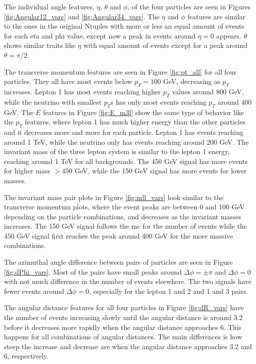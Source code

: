 \documentclass[a4paper, american, 12pt]{report}
\begin{document}
	The individual angle features, $\eta$, $\theta$ and $\phi$, of the four particles are seen in Figures \ref{fig:Angular12_vars} and \ref{fig:Angular34_vars}. The $\eta$ and $\phi$ features are similar to the ones in the original Ntuples with more or less an equal amount of events for each eta and phi value, except now a peak in events around $\eta=0$ appears. $\theta$ shows similar traits like $\eta$ with equal amount of events except for a peak around $\theta=\pi/2$.

	The transverse momentum features are seen in Figure \ref{fig:pt_all} for all four particles. They all have most events below $p_T=100$ GeV, decreasing as $p_T$ increases. Lepton 1 has most events reaching higher $p_T$ values around 800 GeV, while the neutrino with smallest $p_T$s has only most events reaching $p_T$ around 400 GeV. The $E$ features in Figure \ref{fig:E_m3l} show the same type of behavior like the $p_T$ features, where lepton 1 has much higher energy than the other particles and it decreases more and more for each particle. Lepton 1 has events reaching around 1 TeV, while the neutrino only has events reaching around 200 GeV. The invariant mass of the three lepton system is similar to the lepton 1 energy, reaching around 1 TeV for all backgrounds. The 450 GeV signal has more events for higher mass $>450$ GeV, while the 150 GeV signal has more events for lower masses.
	
	The invariant mass pair plots in Figure \ref{fig:mll_vars} look similar to the transverse momentum plots, where the event peaks are between 0 and 100 GeV depending on the particle combinations, and decreases as the invariant masses increases. The 150 GeV signal follows the \acrshort{mc} for the number of events while the 450 GeV signal first reaches the peak around 400 GeV for the more massive combinations. 
	
	The azimuthal angle difference between pairs of particles are seen in Figure \ref{fig:dPhi_vars}. Most of the pairs have small peaks around $\Delta\phi=\pm\pi$ and $\Delta\phi=0$ with not much difference in the number of events elsewhere. The two signals have fewer events around $\Delta\phi=0$, especially for the lepton 1 and 2 and 1 and 3 pairs.
	
	The angular distance features for all four particles in Figure \ref{fig:dR_vars} have the number of events increasing slowly until the angular distance is around 3.2 before it decreases more rapidly when the angular distance approaches 6. This happens for all combinations of angular distances. The main differences is how steep the increase and decrease are when the angular distance approaches 3.2 and 6, respectively. 
	
\end{document}
